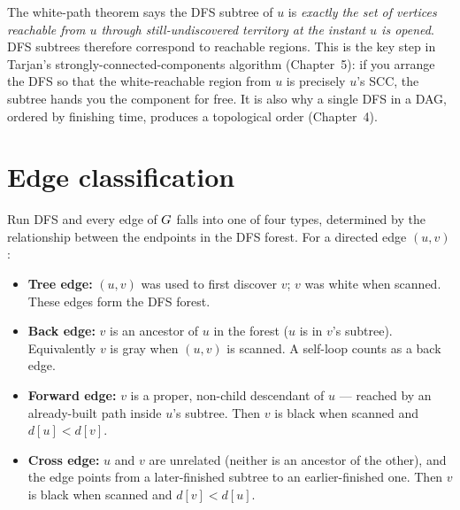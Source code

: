 \begin{whybox}
The white-path theorem says the DFS subtree of $u$ is \emph{exactly the set of vertices reachable from $u$ through still-undiscovered territory at the instant $u$ is opened}. DFS subtrees therefore correspond to reachable regions. This is the key step in Tarjan's strongly-connected-components algorithm (Chapter~5): if you arrange the DFS so that the white-reachable region from $u$ is precisely $u$'s SCC, the subtree hands you the component for free. It is also why a single DFS in a DAG, ordered by finishing time, produces a topological order (Chapter~4).
\end{whybox}

\section{Edge classification}
\label{ch03:edge-types}

Run DFS and every edge of $G$ falls into one of four types, determined by the relationship between the endpoints in the DFS forest. For a directed edge $(u,v)$:

\begin{itemize}
  \item \textbf{Tree edge:} $(u,v)$ was used to first discover $v$; $v$ was white when scanned. These edges form the DFS forest.
  \item \textbf{Back edge:} $v$ is an ancestor of $u$ in the forest ($u$ is in $v$'s subtree). Equivalently $v$ is gray when $(u,v)$ is scanned. A self-loop counts as a back edge.
  \item \textbf{Forward edge:} $v$ is a proper, non-child descendant of $u$ --- reached by an already-built path inside $u$'s subtree. Then $v$ is black when scanned and $d[u]<d[v]$.
  \item \textbf{Cross edge:} $u$ and $v$ are unrelated (neither is an ancestor of the other), and the edge points from a later-finished subtree to an earlier-finished one. Then $v$ is black when scanned and $d[v]<d[u]$.
\end{itemize}

